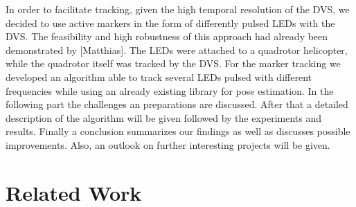 In order to facilitate tracking, given the high temporal resolution of the DVS, we decided to use active markers in the form of differently pulsed LEDs with the DVS. The feasibility and high robustness of this approach had already been demonstrated by [Matthias]. The LEDs were attached to a quadrotor helicopter, while the quadrotor itself was tracked by the DVS.  For the marker tracking we developed an algorithm able to track several LEDs pulsed with different frequencies while using an already existing library for pose estimation. In the following part the challenges an preparations are discussed. After that a detailed description of the algorithm will be given followed by the experiments and results. Finally a conclusion summarizes our findings as well as discusses possible improvements. Also, an outlook on further interesting projects will be given.


\section{Related Work}\label{sec:related_work}
